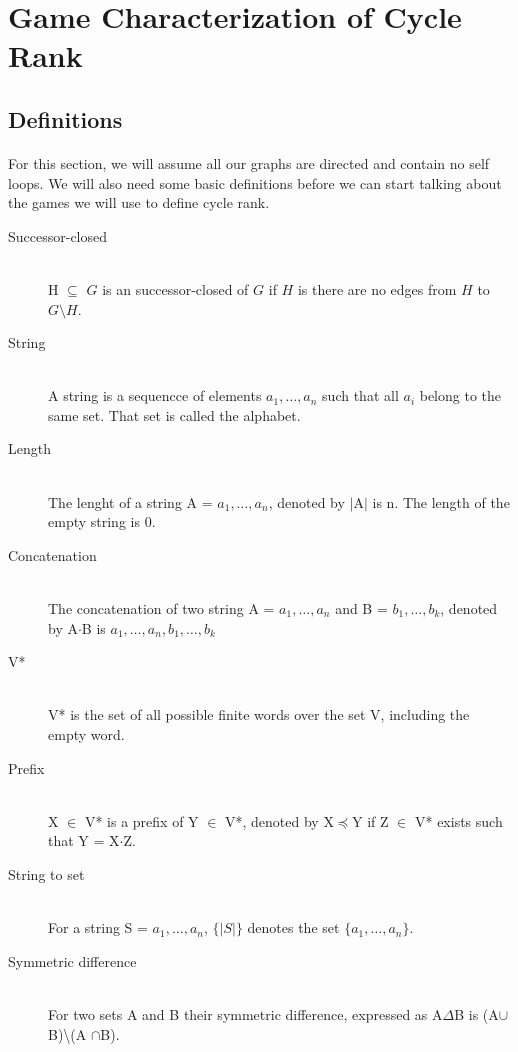\section{Game Characterization of Cycle Rank}

\subsection{Definitions}
\paragraph{}
For this section, we will assume all our graphs are directed and contain no self loops. We will also need some basic definitions before we can start talking about the games we will use to define cycle rank.
\begin{description}
 \item[Successor-closed] \hfill \\
H $\subseteq$ $G$ is an successor-closed of $G$ if $H$ is there are no edges from $H$ to $G \setminus H$.
\item[String] \hfill \\
A string is a sequencce of elements $a_1, \ldots, a_n$ such that all $a_i$ belong to the same set. That set is called the alphabet.
\item[Length] \hfill \\
The lenght of a string  A = $a_1, \ldots, a_n$, denoted by $|$A$|$ is n. The length of the empty string is 0.
\item[Concatenation] \hfill \\
The concatenation of two string A =  $a_1, \ldots, a_n$ and B =  $b_1, \ldots, b_k$, denoted by A$\cdot$B is $a_1, \ldots, a_n,b_1, \ldots, b_k$
\item[V*] \hfill \\
V* is the set of all possible finite words over the set V, including the empty word.
\item[Prefix] \hfill \\
X $\in$ V* is a prefix of Y $\in$ V*, denoted by X$\preceq$Y  if Z $\in$ V* exists such that Y = X$\cdot$Z.
\item[String to set] \hfill \\
For a string S = $a_1, \ldots, a_n$, $\{|S|\}$ denotes the set $\{a_1, \ldots, a_n\}$.
\item[Symmetric difference] \hfill \\
For two sets A and B their symmetric difference, expressed as A$\Delta$B is (A$\cup$B)\textbackslash (A $\cap$B).
\end{description}

